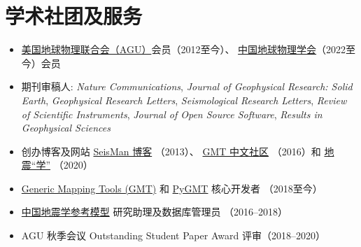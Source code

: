 \section{学术社团及服务}

\begin{itemize}
\item \href{https://sites.agu.org/}{美国地球物理联合会（AGU）}会员（2012至今）、
      \href{http://www.cgscgs.org.cn/}{中国地球物理学会}（2022至今）会员
\item 期刊审稿人:
      \emph{Nature Communications},
      \emph{Journal of Geophysical Research: Solid Earth},
      \emph{Geophysical Research Letters},
      \emph{Seismological Research Letters},
      \emph{Review of Scientific Instruments},
      \emph{Journal of Open Source Software},
      \emph{Results in Geophysical Sciences}
\item 创办博客及网站
      \href{https://blog.seisman.info}{SeisMan 博客} （2013）、
      \href{http://gmt-china.org/}{GMT 中文社区} （2016）和
      \href{https://seismo-learn.org/}{地震``学''} （2020）
\item \href{https://github.com/GenericMappingTools/gmt}{Generic Mapping Tools (GMT)} 和
      \href{https://github.com/GenericMappingTools/pygmt}{PyGMT} 核心开发者 （2018至今）
\item \href{http://chinageorefmodel.org/}{中国地震学参考模型} 研究助理及数据库管理员 （2016--2018）
\item AGU 秋季会议 Outstanding Student Paper Award 评审（2018--2020）
\end{itemize}
